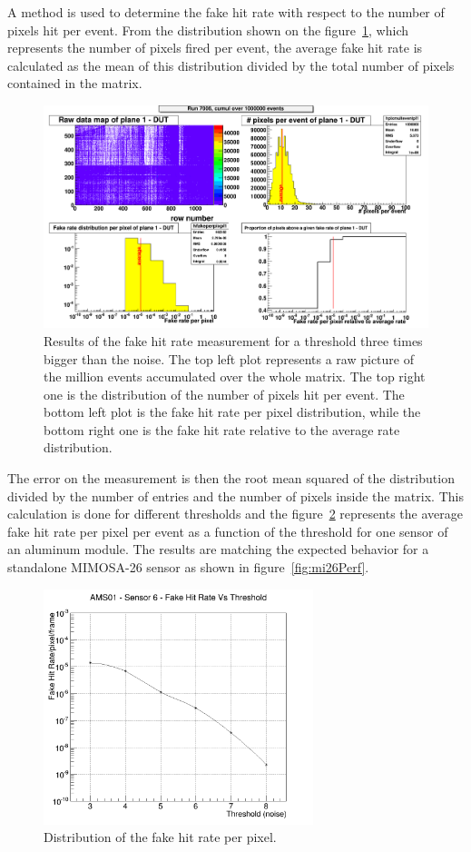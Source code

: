   A method is used to determine the fake hit rate with respect to the number of pixels hit per event.
  From the distribution shown on the figure~\ref{fig:pixel/event}, which represents the number of pixels fired per event, the average fake hit rate is calculated as the mean of this distribution divided by the total number of pixels contained in the matrix.
    \begin{figure}
    \centering
    \includegraphics[width = \textwidth]{Pictures/labTests/FHR_AS01_chip3.png}
    \caption{Results of the fake hit rate measurement for a threshold three times bigger than the noise. The top left plot represents a raw picture of the million events accumulated over the whole matrix. The top right one is the distribution of the number of pixels hit per event. The bottom left plot is the fake hit rate per pixel distribution, while the bottom right one is the fake hit rate relative to the average rate distribution.}
    \label{fig:pixel/event}
  \end{figure}
  The error on the measurement is then the root mean squared of the distribution divided by the number of entries and the number of pixels inside the matrix.
  This calculation is done for different thresholds and the figure~\ref{fig:FHR} represents the average fake hit rate per pixel per event as a function of the threshold for one sensor of an aluminum module.
  The results are matching the expected behavior for a standalone MIMOSA-26 sensor as shown in figure~\ref{fig:mi26Perf}.

  \begin{figure}
    \centering
    \includegraphics[width=0.7\textwidth]{Pictures/labTests/fake_sensor6.png}
    \caption{Distribution of the fake hit rate per pixel.}
    \label{fig:FHR}
  \end{figure}

